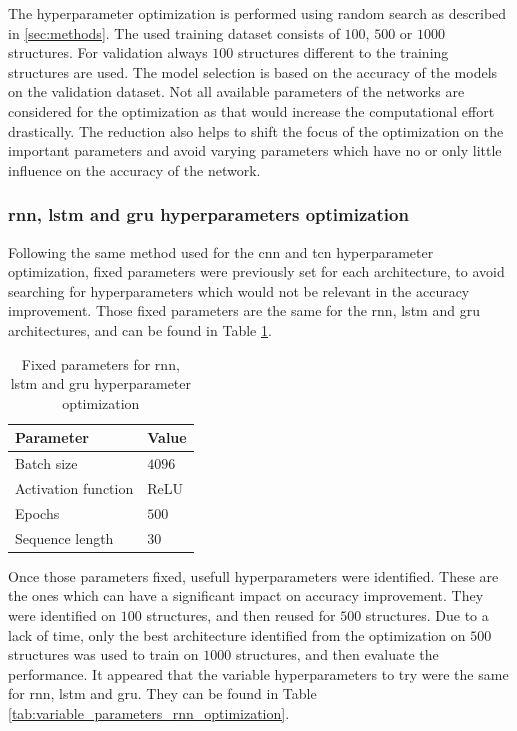\documentclass[conference]{IEEEtran}
\begin{document}
The hyperparameter optimization is performed using random search as described in \ref{sec:methods}. The used training dataset consists of $ 100 $, $ 500 $ or $ 1000 $ structures. For validation always $ 100 $ structures different to the training structures are used. The model selection is based on the accuracy of the models on the validation dataset. Not all available parameters of the networks are considered for the optimization as that would increase the computational effort drastically. The reduction also helps to shift the focus of the optimization on the important parameters and avoid varying parameters which have no or only little influence on the accuracy of the network.

\subsubsection{\gls{rnn}, \gls{lstm} and \gls{gru} hyperparameters optimization}
\label{sec:rnn_hyperparameter_optimization}

Following the same method used for the \gls{cnn} and \gls{tcn} hyperparameter optimization, fixed parameters were previously set for each architecture, to avoid searching for hyperparameters which would not be relevant in the accuracy improvement. Those fixed parameters are the same for the \gls{rnn}, \gls{lstm} and \gls{gru} architectures, and can be found in Table \ref{tab:fixed_parameters_rnn_optimization}.


\begin{table}[htp]
	\centering
	\caption{Fixed parameters for \gls{rnn}, \gls{lstm} and \gls{gru} hyperparameter optimization}
	\label{tab:fixed_parameters_rnn_optimization}
	\begin{tabular}{ll}
		\textbf{Parameter} & \textbf{Value} \\
		\hline
		Batch size & $ 4096 $ \\
		Activation function & ReLU \\
		Epochs & $ 500 $ \\
		Sequence length & $ 30 $ 
	\end{tabular}
\end{table}


Once those parameters fixed, usefull hyperparameters were identified. These are the ones which can have a significant impact on accuracy improvement. They were identified on $ 100 $ structures, and then reused for $ 500 $ structures. Due to a lack of time, only the best architecture identified from the optimization on $ 500 $ structures was used to train on $ 1000 $ structures, and then evaluate the performance. It appeared that the variable hyperparameters to try were the same for \gls{rnn}, \gls{lstm} and \gls{gru}. They can be found in Table \ref{tab:variable_parameters_rnn_optimization}.
\end{document}
